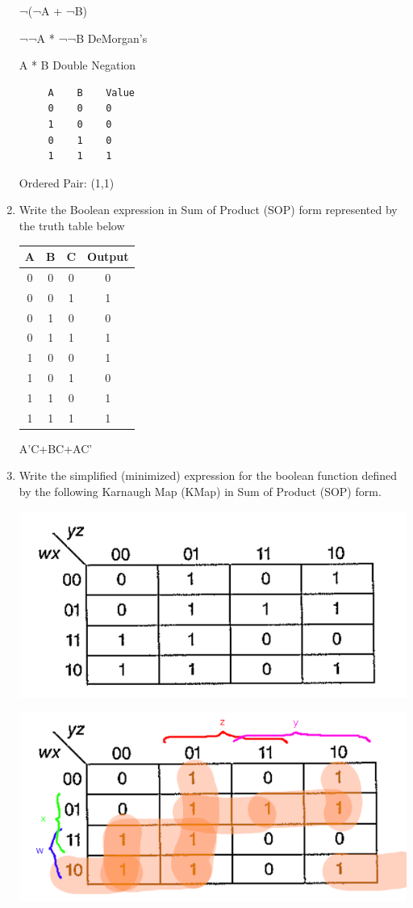 \documentclass[12pt,a4paper,english]{article}
\newcommand\answer[1]{\color{blue}#1\color{black}}
\begin{document}
\begin{enumerate}
   ¬(¬A + ¬B)
 
    ¬¬A * ¬¬B       DeMorgan's 
 
    A * B       Double Negation
 
  \begin{lstlisting}
     A    B    Value
     0    0    0
     1    0    0
     0    1    0
     1    1    1
   \end{lstlisting}

   \answer{Ordered Pair: (1,1)}

\item Write the Boolean expression in Sum of Product (SOP) form represented by the truth table below
 
\begin{tabular}{c | c | c | c }
 \hline
 A & B & C & Output \\ [0.5ex] 
 \hline
 0 & 0 & 0 & 0 \\
 0 & 0 & 1 & 1 \\
 0 & 1 & 0 & 0 \\
 0 & 1 & 1 & 1 \\
 1 & 0 & 0 & 1 \\
 1 & 0 & 1 & 0 \\
 1 & 1 & 0 & 1 \\
 1 & 1 & 1 & 1 \\
\end{tabular}

\answer{A'C+BC+AC'}

\item Write the simplified (minimized) expression for the boolean function defined by the following Karnaugh Map (KMap) in Sum of Product (SOP) form.
  
  \includegraphics[scale=.5]{karnaughmap}

  \includegraphics[scale=.5]{karnaughmaphighlighted}


\end{enumerate}
\end{document}
